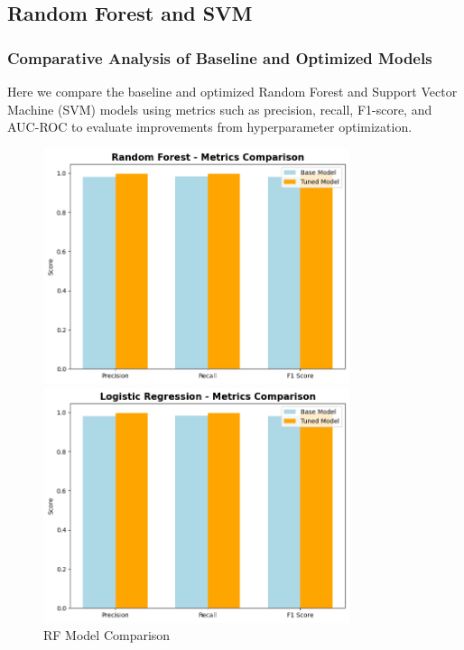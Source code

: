     \subsection{Random Forest and SVM}
    
        \subsubsection{Comparative Analysis of Baseline and Optimized Models \\}
        
            Here we compare the baseline and optimized Random Forest and Support Vector Machine (SVM) models using metrics such as precision, recall, F1-score, and AUC-ROC to evaluate improvements from hyperparameter optimization.
        
            \begin{figure}[h]
                \centering
                \begin{minipage}[c]{0.47\textwidth}
                    \centering
                    \includegraphics[width=0.8\textwidth]{../figures/plots/section2/Random_Forest_Metric_comparison.png}
                    \caption{RF Model Comparison}
                    \label{fig:logistic_tuning}
                \end{minipage}
                \hfill
                \begin{minipage}[c]{0.47\textwidth}
                    \centering
                    \includegraphics[width=0.8\textwidth]{../figures/plots/section2/Logistic_Regression_Metric_comparison.png}

\end{minipage}
\end{figure}
